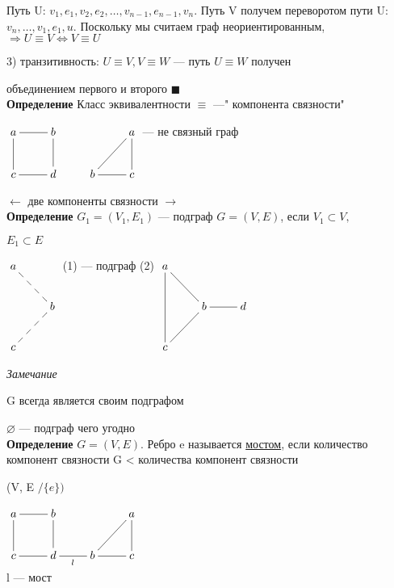\documentclass[a4paper, 12pt] {article}
\begin{document}
Путь U: $v_{1}, e_{1}, v_{2}, e_{2}, \dots, v_{n-1}, e_{n-1}, v_{n}$. Путь V получем переворотом пути U: $v_{n}, \dots, v_{1}, e_{1}, u$. Поскольку мы считаем граф неориентированным, $\Rightarrow U \equiv V \Leftrightarrow V \equiv U$

3) транзитивность: $ U \equiv V, V \equiv W$ --- путь $ U \equiv W$ получен 

объединением первого и второго $\blacksquare$\\

\textbf{Определение}
Класс эквивалентности $  \equiv $ ---" компонента связности"

$\xymatrix{
	a \ar@{-}[d] \ar@{-}[r] & b \ar@{-}[d]  & & a \ar@{-}[d] \ar@{-}[dl]\\
	c  \ar@{-}[r] & d & b \ar@{-}[r] & c\\
}$
--- не связный граф


$\leftarrow$ две компоненты связности $\rightarrow$
\\

\textbf{Определение}
$G_{1} = (V_{1}, E_{1})$ --- подграф $ G = (V, E) $, если $ V_{1} \subset V,$ 

$E_{1} \subset E $

$\xymatrix{
	a  \\
	& b \ar@{--}[ul] \ar@{--}[dl] \\
	c\\
}$
(1) --- подграф (2)
$\xymatrix{
	a \ar@{-}[dd] \\
	& b \ar@{-}[ul] \ar@{-}[dl] & d \ar@{-}[l]\\
	c\\
}$

\textit{Замечание} 

G всегда является своим подграфом

$ \varnothing $ --- подграф чего угодно\\

\textbf{Определение}
$G = (V, E)$. Ребро e называется \underline{мостом}, если количество компонент связности G < количества компонент связности

 (V, E $\text{/} \{e\})$
 
 $\xymatrix{
 	a \ar@{-}[d] \ar@{-}[r] & b \ar@{-}[d]  & & a \ar@{-}[d] \ar@{-}[dl]\\
 	c  \ar@{-}[r] & d \ar@{-}[r]_l & b \ar@{-}[r] & c\\
 }$
 \\
 l --- мост\\
 
\end{document}
